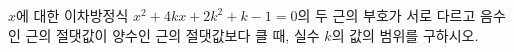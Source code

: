 $x$에 대한 이차방정식 $x^2+4kx+2k^2+k-1=0$의 두 근의 부호가 서로 다르고 음수인 근의 절댓값이 양수인 근의 절댓값보다 클 때, 실수 $k$의 값의 범위를 구하시오.
